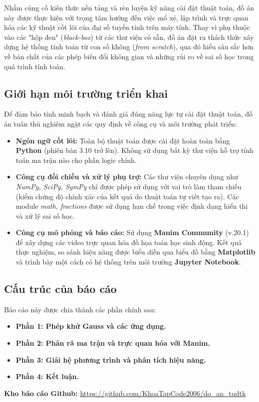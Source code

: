 \documentclass[a4paper]{article}
\begin{document}
Nhằm củng cố kiến thức nền tảng và rèn luyện kỹ năng cài đặt thuật toán, đồ án này được thực hiện với trọng tâm hướng đến việc mổ xẻ, lập trình và trực quan hóa các kỹ thuật cốt lõi của đại số tuyến tính trên máy tính. Thay vì phụ thuộc vào các "hộp đen" (\textit{black-box}) từ các thư viện có sẵn, đồ án đặt ra thách thức xây dựng hệ thống tính toán từ con số không (\textit{from scratch}), qua đó hiểu sâu sắc hơn về bản chất của các phép biến đổi không gian và những rủi ro về sai số học trong quá trình tính toán.
\subsection*{Giới hạn môi trường triển khai}
Để đảm bảo tính minh bạch và đánh giá đúng năng lực tự cài đặt thuật toán, đồ án tuân thủ nghiêm ngặt các quy định về công cụ và môi trường phát triển:
\begin{itemize}
    \item \textbf{Ngôn ngữ cốt lõi:} Toàn bộ thuật toán được cài đặt hoàn toàn bằng \textbf{Python} (phiên bản 3.10 trở lên). Không sử dụng bất kỳ thư viện hỗ trợ tính toán ma trận nào cho phần logic chính.
    \item \textbf{Công cụ đối chiếu và xử lý phụ trợ:} Các thư viện chuyên dụng như \textit{NumPy, SciPy, SymPy} chỉ được phép sử dụng với vai trò làm tham chiếu (kiểm chứng độ chính xác của kết quả do thuật toán tự viết tạo ra). Các module \textit{math, fractions} được sử dụng hạn chế trong việc định dạng hiển thị và xử lý sai số học.
    \item \textbf{Công cụ mô phỏng và báo cáo:} Sử dụng \textbf{Manim Community} (v.20.1) để xây dựng các video trực quan hóa đồ họa toán học sinh động. Kết quả thực nghiệm, so sánh hiệu năng được biểu diễn qua biểu đồ bằng \textbf{Matplotlib} và trình bày một cách có hệ thống trên môi trường \textbf{Jupyter Notebook}.
\end{itemize}
\subsection*{Cấu trúc của báo cáo}
Báo cáo này được chia thành các phần chính sau:
\begin{itemize}
    \item \textbf{Phần 1: Phép khử Gauss và các ứng dụng.} 
    \item \textbf{Phần 2: Phân rã ma trận và trực quan hóa với Manim.}
    \item \textbf{Phần 3: Giải hệ phương trình và phân tích hiệu năng.}
    \item \textbf{Phần 4: Kết luận.}
\end{itemize}
\textbf{Kho báo cáo Github:} \url{https://github.com/KhoaTapCode2006/do_an_tudtk}
\end{document}
